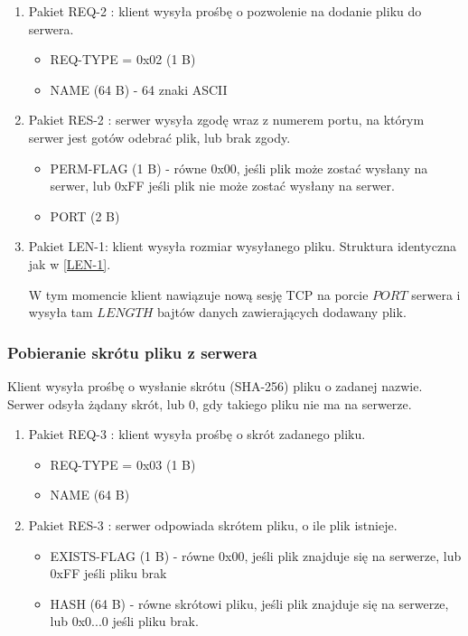 \documentclass{article}
\begin{document}
	\begin{enumerate}
		\item Pakiet REQ-2 \label{REQ-2}: klient wysyła prośbę o pozwolenie na dodanie pliku do serwera. 
		\begin{itemize}
			\item REQ-TYPE = 0x02 (1 B)
			\item NAME (64 B) - 64 znaki ASCII
		\end{itemize}
	
		\item Pakiet RES-2 \label{RES-2}: serwer wysyła zgodę wraz z numerem portu, na którym serwer jest gotów odebrać plik, lub brak zgody. 
		\begin{itemize}
			\item PERM-FLAG (1 B) - równe 0x00, jeśli plik może zostać wysłany na serwer, lub 0xFF jeśli plik nie może zostać wysłany na serwer. 
			\item PORT (2 B) 
		\end{itemize}
	
		\item Pakiet LEN-1: klient wysyła rozmiar wysyłanego pliku. Struktura identyczna jak w \ref{LEN-1}. 
	
		W tym momencie klient nawiązuje nową sesję TCP na porcie $PORT$ serwera i wysyła tam $LENGTH$ bajtów danych zawierających dodawany plik. 

	\end{enumerate}

	\subsubsection{Pobieranie skrótu pliku z serwera}
	Klient wysyła prośbę o wysłanie skrótu (SHA-256) pliku o zadanej nazwie. Serwer odsyła żądany skrót, lub 0, gdy takiego pliku nie ma na serwerze. 
	
	\begin{enumerate}
		\item Pakiet REQ-3 \label{REQ-3}: klient wysyła prośbę o skrót zadanego pliku. 
		\begin{itemize}
			\item REQ-TYPE = 0x03 (1 B)
			\item NAME (64 B)
		\end{itemize}
		
		\item Pakiet RES-3 \label{RES-3}: serwer odpowiada skrótem pliku, o ile plik istnieje.  
		\begin{itemize}
			\item EXISTS-FLAG (1 B) - równe 0x00, jeśli plik znajduje się na serwerze, lub 0xFF jeśli pliku brak
			\item HASH (64 B) - równe skrótowi pliku, jeśli plik znajduje się na serwerze, lub 0x0...0 jeśli pliku brak. 
		\end{itemize}
		
	\end{enumerate}
\end{document}
